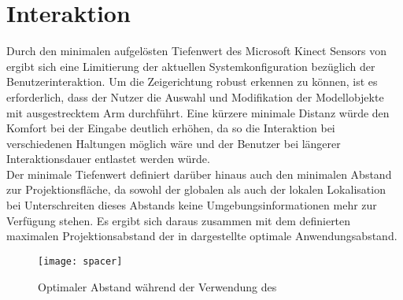 \section{Interaktion}
Durch den minimalen aufgelösten Tiefenwert des Microsoft Kinect Sensors von \red[ABSTAND 0,8m?] ergibt sich eine Limitierung der aktuellen Systemkonfiguration bezüglich der Benutzerinteraktion. Um die Zeigerichtung robust erkennen zu können, ist es erforderlich, dass der Nutzer die Auswahl und Modifikation der Modellobjekte mit ausgestrecktem Arm durchführt. Eine kürzere minimale Distanz würde den Komfort bei der Eingabe deutlich erhöhen, da so die Interaktion bei verschiedenen Haltungen möglich wäre und der Benutzer bei längerer Interaktionsdauer entlastet werden würde.\\

Der minimale Tiefenwert definiert darüber hinaus auch den minimalen Abstand zur Projektionsfläche, da sowohl der globalen als auch der lokalen Lokalisation bei Unterschreiten dieses Abstands keine Umgebungsinformationen mehr zur Verfügung stehen. Es ergibt sich daraus zusammen mit dem definierten maximalen Projektionsabstand der in  dargestellte optimale Anwendungsabstand.\\

\begin{figure}[!ht]
	\begin{center}
		\texttt{[image: spacer]}
		\caption{Optimaler Abstand während der Verwendung des }
		\label{fig.optdist}
	\end{center}
\end{figure}





